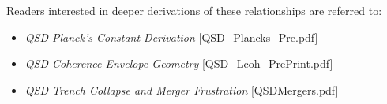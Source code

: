 \documentclass[entropy,article,submit,pdftex,moreauthors]{Definitions/mdpi}
\begin{document}
Readers interested in deeper derivations of these relationships are referred to:
\begin{itemize}
  \item \textit{QSD Planck’s Constant Derivation} [QSD\_Plancks\_Pre.pdf]
  \item \textit{QSD Coherence Envelope Geometry} [QSD\_Lcoh\_PrePrint.pdf]
  \item \textit{QSD Trench Collapse and Merger Frustration} [QSDMergers.pdf]
\end{itemize}



\end{document}
